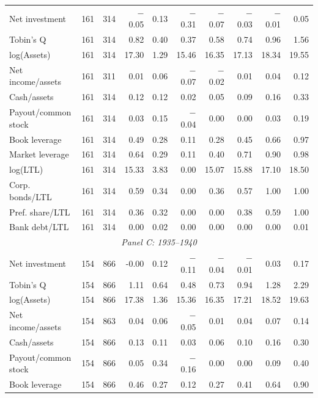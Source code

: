 \begin{table}[p]
\begin{threeparttable}
\begin{tabular}{lrrrrrrrrr}
            \midrule
            Net investment & 161 & 314 & $-$0.05 & 0.13 & $-$0.31 & $-$0.07 & $-$0.03 & $-$0.01 & 0.05 \\
            Tobin's Q & 161 & 314 & 0.82 & 0.40 & 0.37 & 0.58 & 0.74 & 0.96 & 1.56 \\
            log(Assets) & 161 & 314 & 17.30 & 1.29 & 15.46 & 16.35 & 17.13 & 18.34 & 19.55 \\
            Net income/assets & 161 & 311 & 0.01 & 0.06 & $-$0.07 & $-$0.02 & 0.01 & 0.04 & 0.12 \\
            Cash/assets & 161 & 314 & 0.12 & 0.12 & 0.02 & 0.05 & 0.09 & 0.16 & 0.33 \\
            Payout/common stock & 161 & 314 & 0.03 & 0.15 & $-$0.04 & 0.00 & 0.00 & 0.03 & 0.19 \\
            Book leverage & 161 & 314 & 0.49 & 0.28 & 0.11 & 0.28 & 0.45 & 0.66 & 0.97 \\
            Market leverage & 161 & 314 & 0.64 & 0.29 & 0.11 & 0.40 & 0.71 & 0.90 & 0.98 \\
            log(LTL) & 161 & 314 & 15.33 & 3.83 & 0.00 & 15.07 & 15.88 & 17.10 & 18.50 \\
            Corp. bonds/LTL & 161 & 314 & 0.59 & 0.34 & 0.00 & 0.36 & 0.57 & 1.00 & 1.00 \\
            Pref. share/LTL & 161 & 314 & 0.36 & 0.32 & 0.00 & 0.00 & 0.38 & 0.59 & 1.00 \\
            Bank debt/LTL & 161 & 314 & 0.00 & 0.02 & 0.00 & 0.00 & 0.00 & 0.00 & 0.01 \\
            \midrule
            \multicolumn{10}{c}{\textit{Panel C: 1935--1940}} \\
            \midrule
            Net investment & 154 & 866 & -0.00 & 0.12 & $-$0.11 & $-$0.04 & $-$0.01 & 0.03 & 0.17 \\
            Tobin's Q & 154 & 866 & 1.11 & 0.64 & 0.48 & 0.73 & 0.94 & 1.28 & 2.29 \\
            log(Assets) & 154 & 866 & 17.38 & 1.36 & 15.36 & 16.35 & 17.21 & 18.52 & 19.63 \\
            Net income/assets & 154 & 863 & 0.04 & 0.06 & $-$0.05 & 0.01 & 0.04 & 0.07 & 0.14 \\
            Cash/assets & 154 & 866 & 0.13 & 0.11 & 0.03 & 0.06 & 0.10 & 0.16 & 0.30 \\
            Payout/common stock & 154 & 866 & 0.05 & 0.34 & $-$0.16 & 0.00 & 0.00 & 0.09 & 0.40 \\
            Book leverage & 154 & 866 & 0.46 & 0.27 & 0.12 & 0.27 & 0.41 & 0.64 & 0.90 \\

\end{tabular}
\end{threeparttable}
\end{table}

